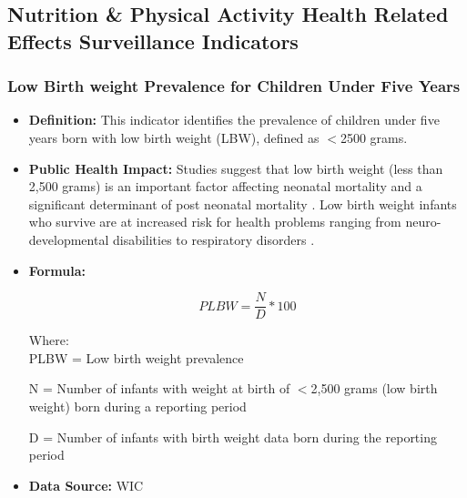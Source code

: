 \documentclass[12pt,letterpaper]{report}
\begin{document}
\subsection{Nutrition \& Physical Activity Health Related Effects Surveillance Indicators}

\subsubsection{Low Birth weight Prevalence for Children Under Five Years} 

	\begin{itemize}
		\item \textbf{Definition:} This indicator identifies the prevalence of children under five years born with low birth weight (LBW), defined as $<$2500 grams. 
		
		\item \textbf{Public Health Impact:} Studies suggest that low birth weight (less than 2,500 grams) is an important factor affecting neonatal mortality and a significant determinant of post neonatal mortality \cite{barker1992fetal}. Low birth weight infants who survive are at increased risk for health problems ranging from neuro-developmental disabilities to respiratory disorders \cite{martorell1999nature} \cite{black2008maternal}.
		
		\item \textbf{Formula:} 
		
			\begin{equation} 
		PLBW = \frac{N}{D} *100	
			\end{equation} 

Where: \\
	PLBW = Low birth weight prevalence
			
			N = Number of infants with weight at birth of $<$2,500 grams (low birth weight) born during a reporting period
			
			D = Number of infants with birth weight data born during the reporting period
		
		\item \textbf{Data Source:} WIC
	\end{itemize}

\end{document}
